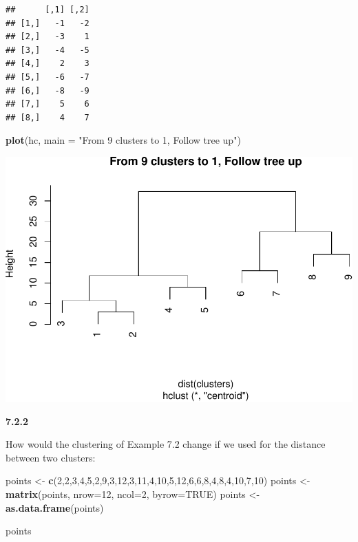 \documentclass[]{article}
\newenvironment{Shaded}{\begin{snugshade}}{\end{snugshade}}
\newcommand{\KeywordTok}[1]{\textcolor[rgb]{0.13,0.29,0.53}{\textbf{{#1}}}}
\newcommand{\DataTypeTok}[1]{\textcolor[rgb]{0.13,0.29,0.53}{{#1}}}
\newcommand{\DecValTok}[1]{\textcolor[rgb]{0.00,0.00,0.81}{{#1}}}
\newcommand{\StringTok}[1]{\textcolor[rgb]{0.31,0.60,0.02}{{#1}}}
\newcommand{\OtherTok}[1]{\textcolor[rgb]{0.56,0.35,0.01}{{#1}}}
\newcommand{\NormalTok}[1]{{#1}}
\begin{document}
\begin{verbatim}
##      [,1] [,2]
## [1,]   -1   -2
## [2,]   -3    1
## [3,]   -4   -5
## [4,]    2    3
## [5,]   -6   -7
## [6,]   -8   -9
## [7,]    5    6
## [8,]    4    7
\end{verbatim}

\begin{Shaded}
\begin{Highlighting}[]
\KeywordTok{plot}\NormalTok{(hc, }\DataTypeTok{main =} \StringTok{"From 9 clusters to 1, Follow tree up"}\NormalTok{)}
\end{Highlighting}
\end{Shaded}

\includegraphics{arancibia_week8_hw_files/figure-latex/unnamed-chunk-1-1.pdf}

\textbf{7.2.2}

How would the clustering of Example 7.2 change if we used for the
distance between two clusters:

\begin{Shaded}
\begin{Highlighting}[]
\NormalTok{points <-}\StringTok{ }\KeywordTok{c}\NormalTok{(}\DecValTok{2}\NormalTok{,}\DecValTok{2}\NormalTok{,}\DecValTok{3}\NormalTok{,}\DecValTok{4}\NormalTok{,}\DecValTok{5}\NormalTok{,}\DecValTok{2}\NormalTok{,}\DecValTok{9}\NormalTok{,}\DecValTok{3}\NormalTok{,}\DecValTok{12}\NormalTok{,}\DecValTok{3}\NormalTok{,}\DecValTok{11}\NormalTok{,}\DecValTok{4}\NormalTok{,}\DecValTok{10}\NormalTok{,}\DecValTok{5}\NormalTok{,}\DecValTok{12}\NormalTok{,}\DecValTok{6}\NormalTok{,}\DecValTok{6}\NormalTok{,}\DecValTok{8}\NormalTok{,}\DecValTok{4}\NormalTok{,}\DecValTok{8}\NormalTok{,}\DecValTok{4}\NormalTok{,}\DecValTok{10}\NormalTok{,}\DecValTok{7}\NormalTok{,}\DecValTok{10}\NormalTok{)}
\NormalTok{points <-}\StringTok{ }\KeywordTok{matrix}\NormalTok{(points, }\DataTypeTok{nrow=}\DecValTok{12}\NormalTok{, }\DataTypeTok{ncol=}\DecValTok{2}\NormalTok{, }\DataTypeTok{byrow=}\OtherTok{TRUE}\NormalTok{)}
\NormalTok{points <-}\StringTok{ }\KeywordTok{as.data.frame}\NormalTok{(points)}

\NormalTok{points}
\end{Highlighting}
\end{Shaded}
\end{document}
